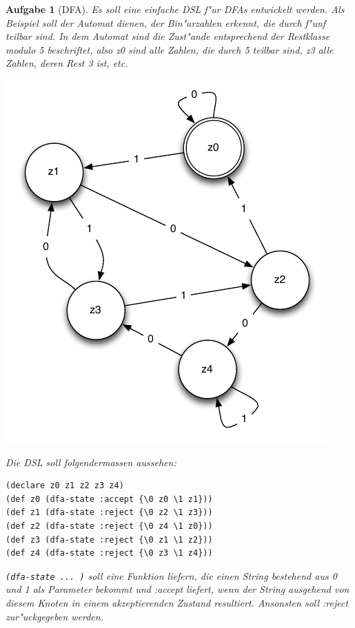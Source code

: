 \documentclass[11pt,a4paper]{article}
\newcounter{numb}
\theoremstyle{break}
\newtheorem{aufgabe}{Aufgabe}[numb]
\begin{document}
\begin{aufgabe}[DFA]
Es soll eine einfache DSL f"ur DFAs entwickelt werden.
Als Beispiel soll der Automat dienen, der Bin"arzahlen erkennt, die durch f"unf teilbar sind.
In dem Automat sind die Zust"ande entsprechend der Restklasse modulo 5 beschriftet,
also z0 sind alle Zahlen, die durch 5 teilbar sind, z3 alle Zahlen, deren Rest 3 ist, etc.

\begin{minipage}{.4\textwidth}
\includegraphics[scale=0.5]{dfa.png} 
\end{minipage}%
\begin{minipage}{.6\textwidth}
Die DSL soll folgendermassen aussehen:

\begin{verbatim}
(declare z0 z1 z2 z3 z4)
(def z0 (dfa-state :accept {\0 z0 \1 z1}))
(def z1 (dfa-state :reject {\0 z2 \1 z3}))
(def z2 (dfa-state :reject {\0 z4 \1 z0}))
(def z3 (dfa-state :reject {\0 z1 \1 z2}))
(def z4 (dfa-state :reject {\0 z3 \1 z4}))
\end{verbatim}

\verb|(dfa-state ... )| soll eine Funktion liefern,
die einen String bestehend aus 0 und 1 als Parameter bekommt und :accept liefert,
wenn der String ausgehend von diesem Knoten in einem akzeptierenden Zustand resultiert.
Ansonsten soll :reject zur"uckgegeben werden. 
\end{minipage}


\end{aufgabe}
\end{document}
